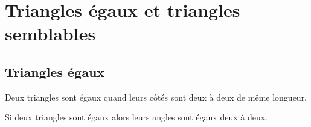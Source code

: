 \documentclass[a4paper,10pt]{report}
\begin{document}
\newpage
\setcounter{chapter}{8}
\chapter{Triangles égaux et triangles semblables}

\vspace{-1mm}
\section{Triangles égaux}

\vspace{-5mm}
\noindent \begin{minipage}{13cm}
\begin{defn}
Deux triangles sont égaux quand leurs côtés sont deux à deux de même longueur.
\end{defn}

\begin{prop}
Si deux triangles sont égaux alors leurs angles sont égaux deux à deux.
\end{prop}
\end{minipage}
\end{document}
